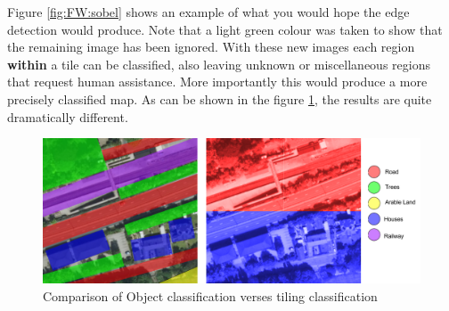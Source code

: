 Figure \ref{fig:FW:sobel} shows an example of what you would hope the edge detection would produce. Note that a light green colour was taken to show that the remaining image has been ignored. With these new images each region \textbf{within} a tile can be classified, also leaving unknown or miscellaneous regions that request human assistance. More importantly this would produce a more precisely classified map. As can be shown in the figure \ref{fig:FW:object_class}, the results are quite dramatically different. 

\begin{figure}[H]
    \centering
    \includegraphics[width=\textwidth]{figs/12/new_classes}
    \caption{Comparison of Object classification verses tiling classification}
    \label{fig:FW:object_class}
\end{figure}
